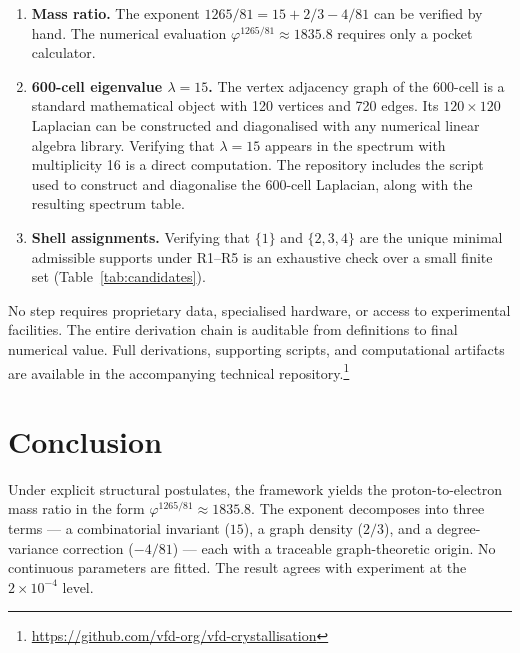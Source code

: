 \documentclass[12pt]{article}
\newcommand{\phig}{\varphi}
\begin{document}
\begin{enumerate}
    \item \textbf{Mass ratio.} The exponent $1265/81 = 15 + 2/3 - 4/81$ can be verified by hand. The numerical evaluation $\phig^{1265/81} \approx 1835.8$ requires only a pocket calculator.

    \item \textbf{600-cell eigenvalue $\lambda = 15$.} The vertex adjacency graph of the 600-cell is a standard mathematical object with 120 vertices and 720 edges. Its $120 \times 120$ Laplacian can be constructed and diagonalised with any numerical linear algebra library. Verifying that $\lambda = 15$ appears in the spectrum with multiplicity 16 is a direct computation. The repository includes the script used to construct and diagonalise the 600-cell Laplacian, along with the resulting spectrum table.

    \item \textbf{Shell assignments.} Verifying that $\{1\}$ and $\{2,3,4\}$ are the unique minimal admissible supports under R1--R5 is an exhaustive check over a small finite set (Table~\ref{tab:candidates}).
\end{enumerate}

No step requires proprietary data, specialised hardware, or access to experimental facilities. The entire derivation chain is auditable from definitions to final numerical value. Full derivations, supporting scripts, and computational artifacts are available in the accompanying technical repository.\footnote{\url{https://github.com/vfd-org/vfd-crystallisation}}

\section{Conclusion}\label{sec:conclusion}

Under explicit structural postulates, the framework yields the proton-to-electron mass ratio in the form $\phig^{1265/81} \approx 1835.8$. The exponent decomposes into three terms --- a combinatorial invariant ($15$), a graph density ($2/3$), and a degree-variance correction ($-4/81$) --- each with a traceable graph-theoretic origin. No continuous parameters are fitted. The result agrees with experiment at the $2 \times 10^{-4}$ level.
\end{document}
